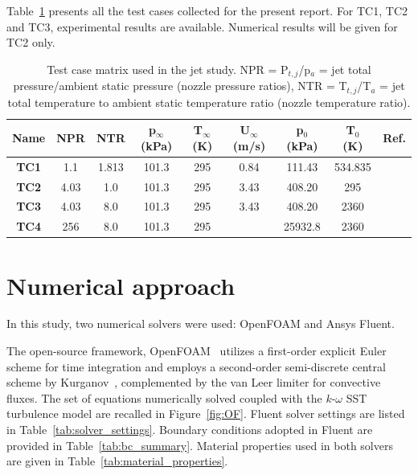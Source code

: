 \documentclass[12pt]{article}
\begin{document}
Table~\ref{tab:test_matrix} presents all the test cases collected for the present report. For TC1, TC2 and TC3, experimental results are available. Numerical results will be given for TC2 only.

\begin{table}[H]
    \centering
    \caption{Test case matrix used in the jet study. NPR = P$_{t,j}$/p$_a$ = jet total pressure/ambient static pressure (nozzle pressure ratios), NTR = T$_{t,j}$/T$_a$ = jet total temperature to ambient static temperature ratio (nozzle temperature ratio).}
    \label{tab:test_matrix}
    \begin{tabular}{ccccccccc}
        \toprule
        Name & NPR & NTR & p$_\infty$ (kPa) & T$_\infty$ (K) & U$_\infty$ (m/s) & p$_0$ (kPa) & T$_0$ (K) & Ref. \\
        \midrule
        \textbf{TC1} & 1.1  & 1.813 & 101.3 & 295  & 0.84 & 111.43 & 534.835 & \cite{seiner1992effects} \\
        \rowcolor{pink}\textbf{TC2} & 4.03 & 1.0 & 101.3 & 295 & 3.43 & 408.20 & 295 & \cite{henderson2005experimental} \\
        \textbf{TC3} & 4.03 & 8.0 & 101.3 & 295 & 3.43 & 408.20 & 2360 & \cite{mcguirk2021near} \\
        \textbf{TC4} & 256  & 8.0 & 101.3 & 295 & & 25932.8 & 2360 & \\
        \bottomrule
    \end{tabular}
\end{table}

\section{Numerical approach}\label{sec:numerics}
In this study, two numerical solvers were used: OpenFOAM and Ansys Fluent.

The open-source framework, OpenFOAM~\cite{opencfd2009open} utilizes a first-order explicit Euler scheme for time integration and employs a second-order semi-discrete central scheme by Kurganov~\cite{kurganov2000new}, complemented by the van Leer limiter for convective fluxes. The set of equations numerically solved coupled with the $k$-$\omega$ SST turbulence model are recalled in Figure~\ref{fig:OF}. Fluent solver settings are listed in Table~\ref{tab:solver_settings}. Boundary conditions adopted in Fluent are provided in Table~\ref{tab:bc_summary}. Material properties used in both solvers are given in Table~\ref{tab:material_properties}.
\end{document}
